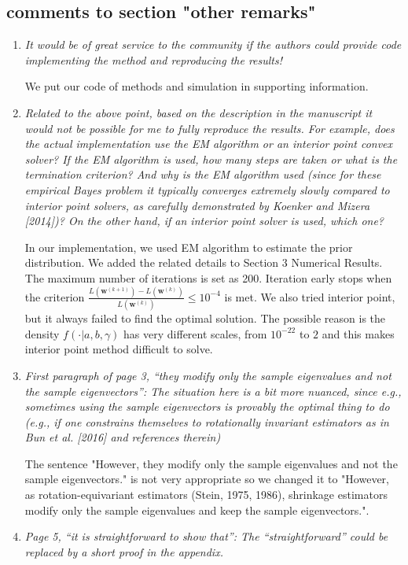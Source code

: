 \documentclass[12pt]{article}
\def\bs{\boldsymbol}
\begin{document}
\subsection{comments to section "other remarks"}
\begin{enumerate}
\item \emph{It would be of great service to the community if the authors could provide code implementing the method and reproducing the results!}

We put our code of methods and simulation in supporting information.
\item \emph{Related to the above point, based on the description in the manuscript it would not be possible for me to fully reproduce the results. For example, does the actual implementation use the EM algorithm or an interior point convex solver? If the EM algorithm is used, how many steps are taken or what is the termination criterion? And why is the EM algorithm used (since for these empirical Bayes problem it typically converges extremely slowly compared to interior point solvers, as carefully demonstrated by Koenker and Mizera [2014])? On the other hand, if an interior point solver is used, which one?}

In our implementation, we used EM algorithm to estimate the prior distribution. We added the related details to Section 3 Numerical Results. The maximum number of iterations is set as 200. Iteration early stops when the criterion $\frac{L(\bs{w}^{(k+1)}) - L(\bs{w}^{(k)})}{L(\bs{w}^{(k)})}\leq 10^{-4}$ is met. We also tried interior point, but it always failed to find the optimal solution. The possible reason is the density $f(\cdot|a,b,\gamma)$ has very different scales, from $10^{-22}$ to $2$ and this makes interior point method difficult to solve.
\item \emph{First paragraph of page 3, “they modify only the sample eigenvalues and not the sample eigenvectors”: The situation here is a bit more nuanced, since e.g., sometimes using the sample eigenvectors is provably the optimal thing to do (e.g., if one constrains themselves to rotationally invariant estimators as in Bun et al. [2016] and references therein)}

The sentence "However, they modify only the sample eigenvalues and not the sample eigenvectors." is not very appropriate so we changed it to "However, as rotation-equivariant estimators (Stein, 1975, 1986), shrinkage estimators modify only the sample eigenvalues and keep the sample eigenvectors.".
\item \emph{Page 5, “it is straightforward to show that”: The “straightforward” could be replaced by a short proof in the appendix.}


\end{enumerate}
\end{document}
